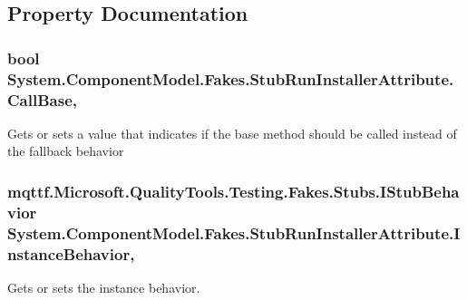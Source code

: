 \subsection{Property Documentation}
\hypertarget{class_system_1_1_component_model_1_1_fakes_1_1_stub_run_installer_attribute_a0c0fd076c13f0fd3af3998456cf20c0a}{
\subsubsection[{Call\-Base}]{\setlength{\rightskip}{0pt plus 5cm}bool System.\-Component\-Model.\-Fakes.\-Stub\-Run\-Installer\-Attribute.\-Call\-Base\hspace{0.3cm}{\ttfamily [get]}, {\ttfamily [set]}}}\label{class_system_1_1_component_model_1_1_fakes_1_1_stub_run_installer_attribute_a0c0fd076c13f0fd3af3998456cf20c0a}


Gets or sets a value that indicates if the base method should be called instead of the fallback behavior

\hypertarget{class_system_1_1_component_model_1_1_fakes_1_1_stub_run_installer_attribute_af3317c253fce5e90a1d146be6fedf15c}{
\subsubsection[{Instance\-Behavior}]{\setlength{\rightskip}{0pt plus 5cm}mqttf.\-Microsoft.\-Quality\-Tools.\-Testing.\-Fakes.\-Stubs.\-I\-Stub\-Behavior System.\-Component\-Model.\-Fakes.\-Stub\-Run\-Installer\-Attribute.\-Instance\-Behavior\hspace{0.3cm}{\ttfamily [get]}, {\ttfamily [set]}}}\label{class_system_1_1_component_model_1_1_fakes_1_1_stub_run_installer_attribute_af3317c253fce5e90a1d146be6fedf15c}


Gets or sets the instance behavior.

